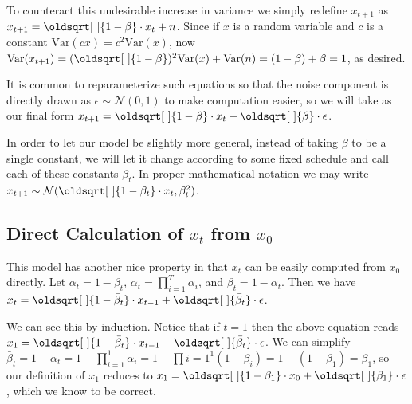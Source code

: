 \documentclass[11pt,dvipsnames]{article}
\renewcommand*{\sqrt}[2][\ ]{\oldsqrt[#1]{#2}}
\begin{document}
To counteract this undesirable increase in variance we simply redefine $x_{t+1}$ as
$x_{t+1} = \sqrt{1 - \beta} \cdot x_t + n$. Since if $x$ is a random variable and $c$ is a
constant $\text{Var}(cx) = c^2\text{Var}(x)$, now
$\text{Var}(x_{t+1}) = (\sqrt{1 - \beta})^2\text{Var}(x) + \text{Var}(n) = (1 - \beta) + \beta = 1$,
as desired.

It is common to reparameterize such equations so that the noise component is directly drawn as
$\epsilon \sim \mathcal{N}(0, 1)$ to make computation easier, so we will take as our final form
$x_{t+1} = \sqrt{1 - \beta} \cdot x_t + \sqrt{\beta} \cdot \epsilon$.

In order to let our model be slightly more general, instead of taking $\beta$ to be a single constant,
we will let it change according to some fixed schedule and call each of these constants $\beta_t$.
In proper mathematical notation we may write $x_{t+1} \sim \mathcal{N}(\sqrt{1 - \beta_t} \cdot x_t, \beta_t^2)$.

\subsection{Direct Calculation of $x_t$ from $x_0$}
This model has another nice property in that $x_t$ can be easily computed from $x_0$ directly.
Let $\alpha_t = 1 - \beta_t$, $\bar\alpha_t = \prod_{i=1}^T \alpha_i$, and $\bar\beta_t = 1 - \bar\alpha_t$.
Then we have $x_t = \sqrt{1 - \bar\beta_t} \cdot x_{t-1} + \sqrt{\bar\beta_t} \cdot \epsilon$.

We can see this by induction. Notice that if $t=1$ then the above equation reads
$x_1 = \sqrt{1 - \bar\beta_t} \cdot x_{t-1} + \sqrt{\bar\beta_t} \cdot \epsilon$.
We can simplify
$\bar\beta_t = 1 - \bar\alpha_t = 1 - \prod_{i=1}^1 \alpha_i = 1 - \prod{i=1}^1 (1 - \beta_i) = 1 - (1 - \beta_1) = \beta_1$,
so our definition of $x_1$ reduces to $x_1 = \sqrt{1 - \beta_1} \cdot x_0 + \sqrt{\beta_1} \cdot \epsilon$, which we know
to be correct.
\end{document}
